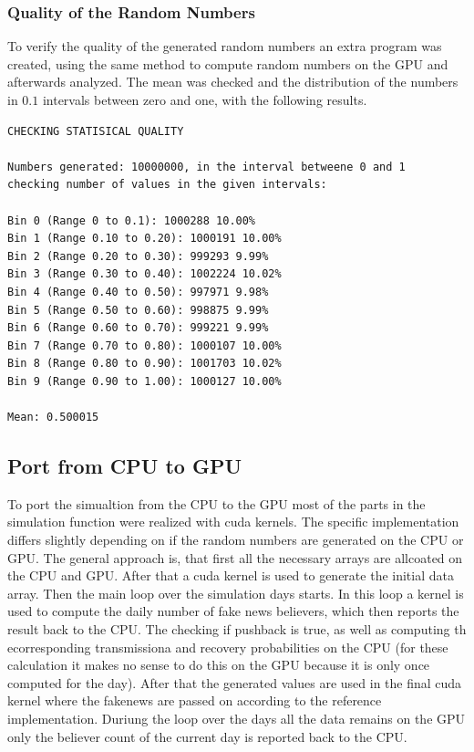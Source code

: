 \documentclass[12pt,a4paper]{article}
\begin{document}
\subsubsection*{Quality of the Random Numbers}
To verify the quality of the generated random numbers an extra program was created, using the same method to compute random numbers on the GPU and afterwards analyzed. The mean was checked and the distribution of the numbers in $0.1$ intervals between zero and one, with the following results.
\begin{lstlisting}
CHECKING STATISICAL QUALITY

Numbers generated: 10000000, in the interval betweene 0 and 1
checking number of values in the given intervals:

Bin 0 (Range 0 to 0.1): 1000288 10.00%
Bin 1 (Range 0.10 to 0.20): 1000191 10.00%
Bin 2 (Range 0.20 to 0.30): 999293 9.99%
Bin 3 (Range 0.30 to 0.40): 1002224 10.02%
Bin 4 (Range 0.40 to 0.50): 997971 9.98%
Bin 5 (Range 0.50 to 0.60): 998875 9.99%
Bin 6 (Range 0.60 to 0.70): 999221 9.99%
Bin 7 (Range 0.70 to 0.80): 1000107 10.00%
Bin 8 (Range 0.80 to 0.90): 1001703 10.02%
Bin 9 (Range 0.90 to 1.00): 1000127 10.00%

Mean: 0.500015
\end{lstlisting}

\subsection*{Port from CPU to GPU}
To port the simualtion from the CPU to the GPU most of the parts in the simulation function were realized with cuda kernels. The specific implementation differs slightly depending on if the random numbers are generated on the CPU or GPU. The general approach is, that first all the necessary arrays are allcoated on the CPU and GPU. After that a cuda kernel is used to generate the initial data array. Then the main loop over the simulation days starts. In this loop a kernel is used to compute the daily number of fake news believers, which then reports the result back to the CPU. The checking if pushback is true, as well as computing th ecorresponding transmissiona and recovery probabilities on the CPU (for these calculation it makes no sense to do this on the GPU because it is only once computed for the day). After that the generated values are used in the final cuda kernel where the fakenews are passed on according to the reference  implementation. Duriung the loop over the days all the data remains on the GPU only the believer count of the current day is reported back to the CPU.
\end{document}
